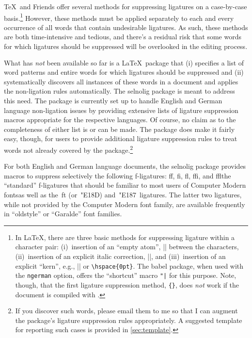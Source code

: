 \documentclass[12pt]{article}
\newcommand{\pkg}[1]{\textsf{#1}}
\newcommand{\opt}[1]{\texttt{#1}}
\begin{document}
\TeX\ and Friends offer several methods for suppressing ligatures on a case-by-case basis.\footnote{In \LaTeX, there are three basic methods for suppressing ligature within a character pair: (i)~insertion of an \enquote{empty atom}, |{}| between the characters, (ii)~insertion of an explicit italic correction, |\/|, and (iii)~insertion of an explicit \enquote{kern}, e.g., |\kern0pt| or \Verb/\hspace{0pt}/. The \pkg{babel} package, when used with the \opt{ngerman} option, offers the \enquote{shortcut} macro \Verb/"|/ for this purpose. Note, though, that the first ligature suppression method, \Verb/{}/, does \emph{not} work if the document is compiled with \LuaLaTeX.} However, these methods must be applied separately to each and every occurrence of all words that contain undesirable ligatures. As such, these methods are both time-intensive and tedious, and there's a residual risk that some words for which ligatures should be suppressed will be overlooked in the editing process. 

What has \emph{not} been available so far is a \LaTeX\ package that (i) specifies a list of word patterns and entire words for which ligatures should be suppressed and (ii) systematically discovers all instances of these words in a document and applies the non-ligation rules automatically. The \pkg{selnolig} package is meant to address this need. The package is currently set up to handle English and German language non-ligation issues by providing extensive lists of ligature suppression macros appropriate for the respective languages. Of course, no claim as to the completeness of either list is or can be made. The package does make it fairly easy, though, for users to provide additional ligature suppression rules to treat words not already covered by the package.\footnote{If you discover such words, please email them to me so that I can augment the package's ligature suppression rules appropriately. A suggested template for reporting such cases is provided in \cref{sec:template}.} 

For both English and German language documents, the \pkg{selnolig} package provides macros to suppress selectively the following f-ligatures: ff, fi, fl, ffi, and ffl\textemdash the \enquote{standard} f-ligatures that should be familiar to most users of Computer Modern fonts\textemdash as well as the~ft (or~\char"E18D) and~\char"E187\ ligatures. The latter two ligatures, while not provided by the Computer Modern font family, are available frequently in \enquote{oldstyle} or \enquote{Garalde} font families.
\end{document}
